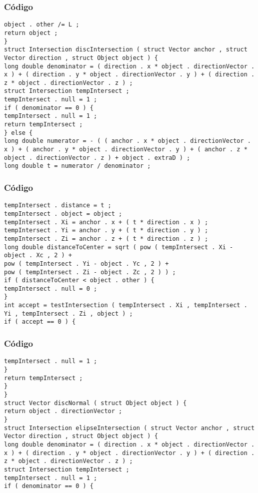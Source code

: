 \documentclass{beamer}
\begin{document}
\begin{frame}[fragile]
\frametitle{C\'odigo}
\begin{verbatim}
object . other /= L ; 
return object ; 
} 
struct Intersection discIntersection ( struct Vector anchor , struct Vector direction , struct Object object ) { 
long double denominator = ( direction . x * object . directionVector . x ) + ( direction . y * object . directionVector . y ) + ( direction . z * object . directionVector . z ) ; 
struct Intersection tempIntersect ; 
tempIntersect . null = 1 ; 
if ( denominator == 0 ) { 
tempIntersect . null = 1 ; 
return tempIntersect ; 
} else { 
long double numerator = - ( ( anchor . x * object . directionVector . x ) + ( anchor . y * object . directionVector . y ) + ( anchor . z * object . directionVector . z ) + object . extraD ) ; 
long double t = numerator / denominator ; 
\end{verbatim}
\end{frame}
\begin{frame}[fragile]
\frametitle{C\'odigo}
\begin{verbatim}
tempIntersect . distance = t ; 
tempIntersect . object = object ; 
tempIntersect . Xi = anchor . x + ( t * direction . x ) ; 
tempIntersect . Yi = anchor . y + ( t * direction . y ) ; 
tempIntersect . Zi = anchor . z + ( t * direction . z ) ; 
long double distanceToCenter = sqrt ( pow ( tempIntersect . Xi - object . Xc , 2 ) + 
pow ( tempIntersect . Yi - object . Yc , 2 ) + 
pow ( tempIntersect . Zi - object . Zc , 2 ) ) ; 
if ( distanceToCenter < object . other ) { 
tempIntersect . null = 0 ; 
} 
int accept = testIntersection ( tempIntersect . Xi , tempIntersect . Yi , tempIntersect . Zi , object ) ; 
if ( accept == 0 ) { 
\end{verbatim}
\end{frame}
\begin{frame}[fragile]
\frametitle{C\'odigo}
\begin{verbatim}
tempIntersect . null = 1 ; 
} 
return tempIntersect ; 
} 
} 
struct Vector discNormal ( struct Object object ) { 
return object . directionVector ; 
} 
struct Intersection elipseIntersection ( struct Vector anchor , struct Vector direction , struct Object object ) { 
long double denominator = ( direction . x * object . directionVector . x ) + ( direction . y * object . directionVector . y ) + ( direction . z * object . directionVector . z ) ; 
struct Intersection tempIntersect ; 
tempIntersect . null = 1 ; 
if ( denominator == 0 ) { 
\end{verbatim}
\end{frame}
\end{document}
